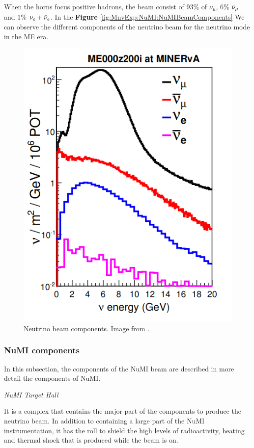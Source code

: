 When the horns focus positive hadrons, the beam consist of 93\% of $\nu_\mu$, 6\% $\Bar{\nu}_\mu$ and 1\% $\nu_e + \Bar{\nu}_e$. In the \textbf{Figure} \ref{fig:MnvExp:NuMI:NuMIBeamComponents} We can observe the different components of the neutrino beam for the neutrino mode in the ME era. 
\begin{figure}[!htb]
\centering
\includegraphics[scale=0.4]{Figures/Chapter2/NuMIbeamComponents.png}
        \caption{Neutrino beam components. Image from \cite{LeoThesis}.} 
\label{fig:MnvExp:NuMI:NuMIviews}
\end{figure}


\subsubsection{NuMI components}
In this subsection, the components of the NuMI beam are described in more detail the components of NuMI.

\textit{NuMI Target Hall}

It is a complex that contains the major part of the components to produce the neutrino beam. In addition to containing a large part of the NuMI instrumentation, it has the roll to shield the high levels of radioactivity, heating and thermal shock that is produced while the beam is on.  

